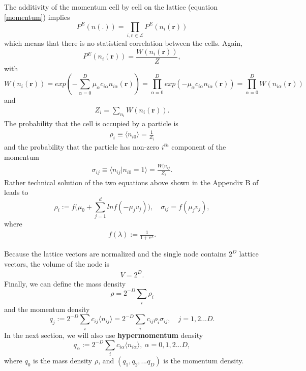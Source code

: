 The additivity of the momentum cell by cell on the lattice (equation \ref{momentum}) implies
\begin{equation}
P^E(n(.)) = \prod_{i,\bm{r} \in \mathcal{L}} P^E(n_i(\bm{r}))
\end{equation}
which means that there is no statistical correlation between the cells.
Again,
\begin{equation}
P^E(n_i(\bm{r})) = \frac{W(n_i(\bm{r}))}{Z},
\end{equation}
with
\begin{equation} \label{mprobab}
W(n_i(\bm{r}))=exp(-\sum_{\alpha = 0}^D\mu_{\alpha}c_{i\alpha}n_{i\alpha}(\bm{r})) = \prod_{\alpha=0}^Dexp(-\mu_{\alpha}c_{i\alpha}n_{i\alpha}(\bm{r})) = \prod_{\alpha = 0}^D W(n_{i\alpha}(\bm{r}))
\end{equation}
and
\begin{align*}
Z_i = \sum_{n_i} W(n_i(\bm{r})).
\end{align*}
The probability that the cell is occupied by a particle is
\begin{align*}
\rho_i \equiv \langle n_{i0} \rangle = \frac{1}{Z_i}
\end{align*}
and the probability that the particle has non-zero $i^{th}$ component of the momentum
\begin{align*}
\sigma_{ij} \equiv \langle n_{ij} | n_{i0} = 1 \rangle = \frac{W(n_{ij}}{Z_i}.
\end{align*}
Rather technical solution of the two equations above shown in the Appendix B of \cite{nasilowski} leads to
\begin{equation} \label{form1}
\rho_i := f\big(\mu_0 + \sum_{j=1}^d ln f(-\mu_j v_j) \big), \quad \sigma_{ij} = f(\mu_j v_j),
\end{equation}
where
\begin{align*}
f(\lambda) := \frac{1}{1 + e^{\lambda}}.
\end{align*}

Because the lattice vectors are normalized and the single node contains $2^D$ lattice vectors, the volume of the node is
\begin{align*}
V = 2^D.
\end{align*}
Finally, we can define the mass density
\begin{equation}
\rho = 2^{-D} \sum_i \rho_i
\end{equation}
and the momentum density
\begin{equation}
q_j := 2^{-D} \sum_i c_{ij} \langle n_{ij} \rangle = 2^{-D} \sum_i c_{ij} \rho_i \sigma_{ij}, \quad j=1,2...D.
\end{equation}
In the next section, we will also use \textbf{hypermomentum} density
\begin{equation} \label{hypermom}
q_{\alpha} := 2^{-D} \sum_i c_{i\alpha} \langle n_{i\alpha} \rangle,~\alpha = 0,1,2...D,
\end{equation}
where $q_0$ is the mass density $\rho$, and $(q_1,q_2,...q_D)$ is the momentum density.

